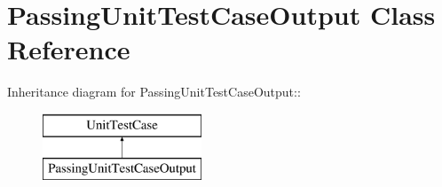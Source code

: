 \hypertarget{class_passing_unit_test_case_output}{
\section{PassingUnitTestCaseOutput Class Reference}
\label{class_passing_unit_test_case_output}
}
Inheritance diagram for PassingUnitTestCaseOutput::\begin{figure}[H]
\begin{center}
\leavevmode
\includegraphics[height=2cm]{class_passing_unit_test_case_output}
\end{center}
\end{figure}
